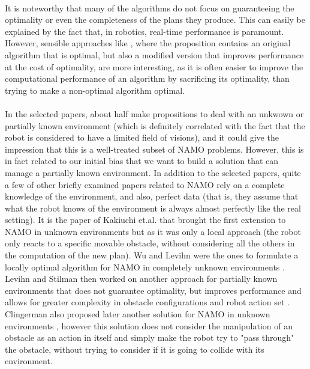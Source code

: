 \paragraph{} It is noteworthy that many of the algorithms do not focus on guaranteeing the optimality or even the completeness of the plans they produce. This can easily be explained by the fact that, in robotics, real-time performance is paramount. However, sensible approaches like \parencite{stilman_navigation_2005, wu_navigation_2010}, where the proposition contains an original algorithm that is optimal, but also a modified version that improves performance at the cost of optimality, are more interesting, as it is often easier to improve the computational performance of an algorithm by sacrificing its optimality, than trying to make a non-optimal algorithm optimal.

\paragraph{} In the selected papers, about half make propositions to deal with an unkwown or partially known environment (which is definitely correlated with the fact that the robot is considered to have a limited field of visions), and it could give the impression that this is a well-treated subset of NAMO problems. However, this is in fact related to our initial bias that we want to build a solution that can manage a partially known environment. In addition to the selected papers, quite a few of other briefly examined papers related to NAMO \parencite{chen_practical_1991, okada_humanoid_2005, nieuwenhuisen_effective_2008, berg_path_2009, kaelbling_hierarchical_2011, levihn_hierarchical_2013, levihn_autonomous_2014} rely on a complete knowledge of the environment, and also, perfect data (that is, they assume that what the robot knows of the environment is always almost perfectly like the real setting). It is the paper of Kakiuchi et.al. \parencite{kakiuchi_working_2010} that brought the first extension to NAMO in unknown environments \parencite{levihn_locally_2014} but as it was only a local approach (the robot only reacts to a specific movable obstacle, without considering all the others in the computation of the new plan). Wu and Levihn were the ones to formulate a locally optimal algorithm for NAMO in completely unknown environments \parencite{wu_navigation_2010, levihn_locally_2014}. Levihn and Stilman then worked on another approach for partially known environments that does not guarantee optimality, but improves performance and allows for greater complexity in obstacle configurations and robot action set \parencite{levihn_foresight_2013}. Clingerman also proposed later another solution for NAMO in unknown environments \parencite{clingerman_estimating_2014, clingerman_dynamic_2015}, however this solution does not consider the manipulation of an obstacle as an action in itself and simply make the robot try to "pass through" the obstacle, without trying to consider if it is going to collide with its environment.

